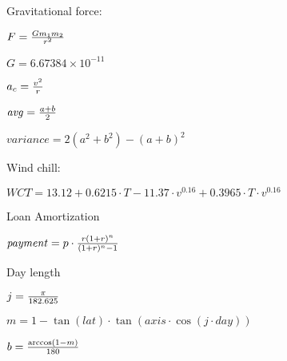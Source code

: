\documentclass{article}
\begin{document}
Gravitational force:

$F = {G m_1 m_2 \over r^2}$

$G = 6.67384 \times 10^{-11}$

$a_c = {v^2 \over r}$

$\mathit{avg} = { {a + b} \over 2}$

$\mathit{variance} = 2(a^2+b^2) - {(a+b)}^2$

Wind chill:

$\mathit{WCT} = 13.12 + 0.6215 \cdot T - 11.37 \cdot v^{0.16} + 0.3965 \cdot T \cdot v^{0.16}$

Loan Amortization

$\mathit{payment} = p \cdot {{r(1+r)^n} \over {{(1+r)^n} - 1}}$

Day length

$j = {\pi \over 182.625}$

$m = 1 - \tan(\mathit{lat}) \cdot \tan(\mathit{axis} \cdot \cos(j \cdot day))$

$b = {\arccos(1 - m) \over 180}$
\end{document}
